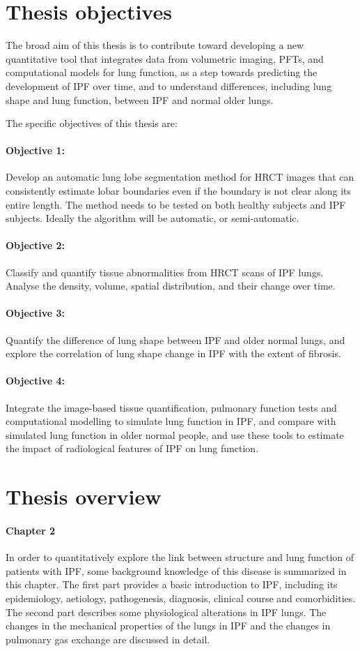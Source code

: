 \section{Thesis objectives} \label{ThesisObjective}
The broad aim of this thesis is to contribute toward developing a new quantitative tool that integrates data from volumetric imaging, PFTs, and computational models for lung function, as a step towards predicting the development of IPF over time, and to understand differences, including lung shape and lung function, between IPF and normal older lungs. 

The specific objectives of this thesis are:

\paragraph{Objective 1:} Develop an automatic lung lobe segmentation method for HRCT images that can consistently estimate lobar boundaries even if the boundary is not clear along its entire length. The method needs to be tested on both healthy subjects and IPF subjects. Ideally the algorithm will be automatic, or semi-automatic.
\paragraph{Objective 2:} Classify and quantify tissue abnormalities from HRCT scans of IPF lungs. Analyse the density, volume, spatial distribution, and their change over time.
\paragraph{Objective 3:} Quantify the difference of lung shape between IPF and older normal lungs, and explore the correlation of lung shape change in IPF with the extent of fibrosis.
\paragraph{Objective 4:} Integrate the image-based tissue quantification, pulmonary function tests and computational modelling to simulate lung function in IPF, and compare with simulated lung function in older normal people, and use these tools to estimate the impact of radiological features of IPF on lung function.

\section{Thesis overview}
\paragraph{Chapter 2} In order to quantitatively explore the link between structure and lung function of patients with IPF, some background knowledge of this disease is summarized in this chapter. The first part provides a basic introduction to IPF, including its epidemiology, aetiology, pathogenesis, diagnosis, clinical course and comorbidities. The second part describes some physiological alterations in IPF lungs. The changes in the mechanical properties of the lungs in IPF and the changes in pulmonary gas exchange are discussed in detail.
